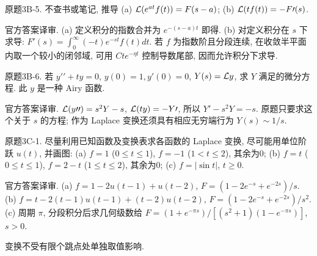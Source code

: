 \begin{exercise}\label{cw:bank-3B-5}
原题3B-5. 不查书或笔记, 推导 (a) $\mathcal L(e^{at}f(t))=F(s-a)$; (b) $\mathcal L(tf(t))=-F\prime(s)$.
\end{exercise}
\begin{solution}
官方答案译审. (a) 定义积分的指数合并为 $e^{-(s-a)t}$ 即得. (b) 对定义积分在 $s$ 下求导: $F\prime(s)=\int_0^\infty(-t)e^{-st}f(t)dt$. 若 $f$ 为指数阶且分段连续, 在收敛半平面内取一个较小的闭邻域, 可用 $Ct e^{-\eta t}$ 控制导数尾部, 因而允许积分下求导.
\end{solution}
\begin{exercise}\label{cw:bank-3B-6}
原题3B-6. 若 $y\prime\prime+ty=0$, $y(0)=1,y\prime(0)=0$, $Y(s)=\mathcal L y$, 求 $Y$ 满足的微分方程. 此 $y$ 是一种 Airy 函数.
\end{exercise}
\begin{solution}
官方答案译审. $\mathcal L(y\prime\prime)=s^2Y-s$, $\mathcal L(ty)=-Y\prime$, 所以 $Y\prime-s^2Y=-s$. 原题只要求这个关于 $s$ 的方程; 作为 Laplace 变换还须具有相应无穷端行为 $Y(s)\sim1/s$.
\end{solution}
\begin{exercise}\label{cw:bank-3C-1}
原题3C-1. 尽量利用已知函数及变换表求各函数的 Laplace 变换, 尽可能用单位阶跃 $u(t)$, 并画图: (a) $f=1$ ($0\le t\le1$), $f=-1$ ($1<t\le2$), 其余为0; (b) $f=t$ ($0\le t\le1$), $f=2-t$ ($1\le t\le2$), 其余为0; (c) $f=|\sin t|$, $t\ge0$.
\end{exercise}
\begin{solution}
官方答案译审. (a) $f=1-2u(t-1)+u(t-2)$, $F=(1-2e^{-s}+e^{-2s})/s$. (b) $f=t-2(t-1)u(t-1)+(t-2)u(t-2)$, $F=(1-2e^{-s}+e^{-2s})/s^2$. (c) 周期 $\pi$, 分段积分后求几何级数给 $F=(1+e^{-\pi s})/[(s^2+1)(1-e^{-\pi s})]$, $s>0$.\begin{center}\end{center}变换不受有限个跳点处单独取值影响.
\end{solution}
